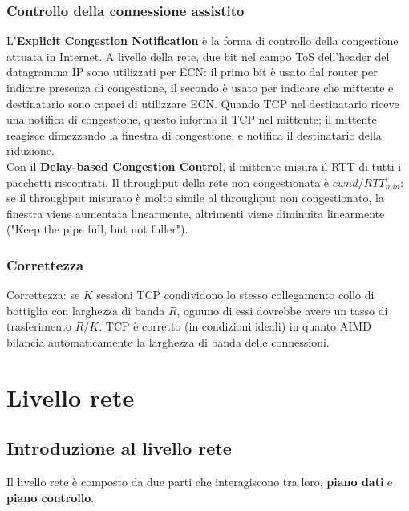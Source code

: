 \documentclass[11pt]{article}
\begin{document}
\subsubsection{Controllo della connessione assistito}
L'\textbf{Explicit Congestion Notification} è la forma di controllo della congestione attuata in Internet. A livello della 
rete, due bit nel campo ToS dell'header del datagramma IP sono utilizzati per ECN: il primo bit è usato dal router per indicare 
presenza di congestione, il secondo è usato per indicare che mittente e destinatario sono capaci di utilizzare ECN.
Quando TCP nel destinatario riceve una notifica di congestione, questo informa il TCP nel mittente; il mittente reagisce dimezzando 
la finestra di congestione, e notifica il destinatario della riduzione.\\
Con il \textbf{Delay-based Congestion Control}, il mittente misura il RTT di tutti i pacchetti riscontrati. Il throughput 
della rete non congestionata è $cwnd/RTT_{min}$: se il throughput misurato è molto simile al throughput non congestionato, 
la finestra viene aumentata linearmente, altrimenti viene diminuita linearmente ("Keep the pipe full, but not fuller").
\subsubsection{Correttezza}
Correttezza: se $K$ sessioni TCP condividono lo stesso collegamento collo di bottiglia con larghezza di banda $R$, ognuno di essi dovrebbe 
avere un tasso di trasferimento $R/K$. TCP è corretto (in condizioni ideali) in quanto AIMD bilancia automaticamente la 
larghezza di banda delle connessioni.\\
\section{Livello rete}
\subsection{Introduzione al livello rete}
Il livello rete è composto da due parti che interagiscono tra loro, \textbf{piano dati} e \textbf{piano controllo}.
\end{document}
